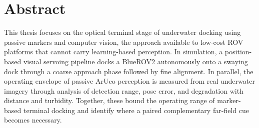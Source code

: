 \section*{Abstract}

This thesis focuses on the optical terminal stage of underwater docking using passive markers and computer vision, the approach available to low-cost ROV platforms that cannot carry learning-based perception. In simulation, a position-based visual servoing pipeline docks a BlueROV2 autonomously onto a swaying dock through a coarse approach phase followed by fine alignment. In parallel, the operating envelope of passive ArUco perception is measured from real underwater imagery through analysis of detection range, pose error, and degradation with distance and turbidity. Together, these bound the operating range of marker-based terminal docking and identify where a paired complementary far-field cue becomes necessary.
